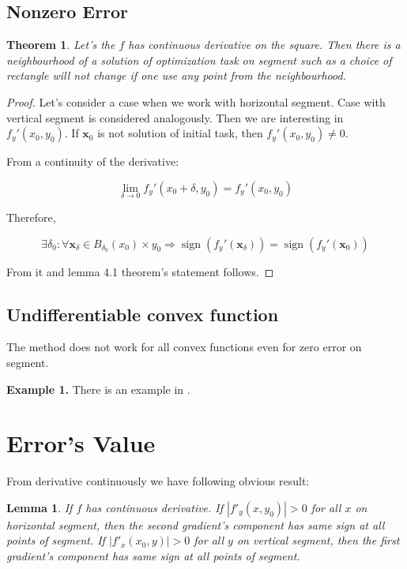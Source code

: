 \documentclass[12pt]{article}
\newtheorem{theorem}{Theorem}[section]
\newtheorem{lemma}{Lemma}[section]
\DeclareMathOperator{\sign}{sign}
\begin{document}
\subsection{Nonzero Error}
\begin{theorem}
Let's the $f$ has continuous derivative on the square. Then there is a neighbourhood of a solution of optimization task on segment such as a choice of rectangle will not change if one use any point from the   neighbourhood.
\end{theorem}
\begin{proof}
Let's consider a case when we work with horizontal segment. Case with vertical segment is considered analogously. Then we are interesting in $f_y'(x_0, y_0)$. If $\textbf{x}_0$ is not solution of initial task, then $f_y'(x_0, y_0) \neq 0$. 

From a continuity of the derivative:

$$\lim\limits_{\delta \rightarrow 0}f_y'(x_0+\delta, y_0) = f_y'(x_0, y_0)$$

Therefore, 

$$\exists \delta_0:\forall \textbf{x}_\delta\in B_{\delta_0}(x_0)\times y_0\Rightarrow \sign(f_y'(\textbf{x}_\delta)) = \sign(f_y'(\textbf{x}_0))$$

From it and lemma 4.1 theorem's statement follows.

\end{proof}

\subsection{Undifferentiable convex function}

The method does not work for all convex functions even for zero error on segment. 

\textbf{Example 1.} There is an example in \cite{Ston_Pas}.

\section{Error's Value}

From derivative continuously we have following obvious result:

\begin{lemma}
If $f$ has continuous derivative. If $|f'_y(x, y_0)| > 0$ for all $x$ on horizontal segment, then the second gradient's component has same sign at all points of segment. If $|f'_x(x_0, y)| > 0$ for all $y$ on vertical segment, then the first gradient's component has same sign at all points of segment.
\end{lemma}
\end{document}
